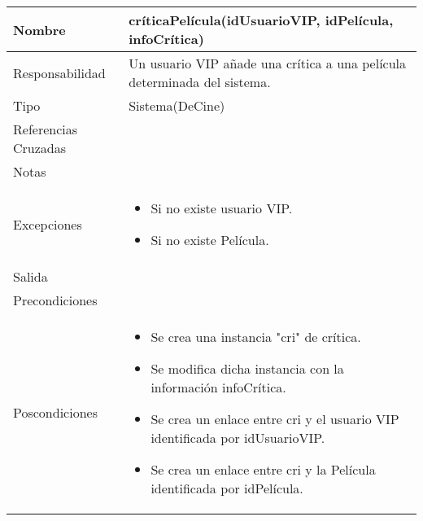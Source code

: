 \documentclass{article}
\begin{document}
\begin{table}[h]
\begin{tabular}{|l|l|l|l|l|l|}
\hline
\multicolumn{2}{|p{3cm}|}{Nombre} & \multicolumn{4}{p{10cm}|}{\textbf{críticaPelícula(idUsuarioVIP, idPelícula, infoCrítica)}}\\
\hline
\multicolumn{2}{|p{3cm}|}{Responsabilidad} & \multicolumn{4}{p{10cm}|}{Un usuario VIP añade una crítica a una película determinada del sistema.} \\
\hline
\multicolumn{2}{|p{3cm}|}{Tipo} & \multicolumn{4}{p{10cm}|}{Sistema(DeCine)} \\
\hline
\multicolumn{2}{|p{3cm}|}{Referencias Cruzadas} & \multicolumn{4}{p{10cm}|}{} \\
\hline
\multicolumn{2}{|p{3cm}|}{Notas} & \multicolumn{4}{p{10cm}|}{} \\
\hline
\multicolumn{2}{|p{3cm}|}{Excepciones} & \multicolumn{4}{p{10cm}|}{\begin{itemize}
\item Si no existe usuario VIP.
\item Si no existe Película.
\end{itemize}} \\
\hline
\multicolumn{2}{|p{3cm}|}{Salida} & \multicolumn{4}{p{10cm}|}{} \\
\hline
\multicolumn{2}{|p{3cm}|}{Precondiciones} & \multicolumn{4}{p{10cm}|}{} \\
\hline
\multicolumn{2}{|p{3cm}|}{Poscondiciones} & \multicolumn{4}{p{10cm}|}{\begin{itemize}
\item Se crea una instancia "cri" de crítica.
\item Se modifica dicha instancia con la información infoCrítica.
\item Se crea un enlace entre cri y el usuario VIP identificada por idUsuarioVIP.
\item Se crea un enlace entre cri y la Película identificada por idPelícula.
\end{itemize}} \\
\hline
\end{tabular}
\end{table}
\end{document}
